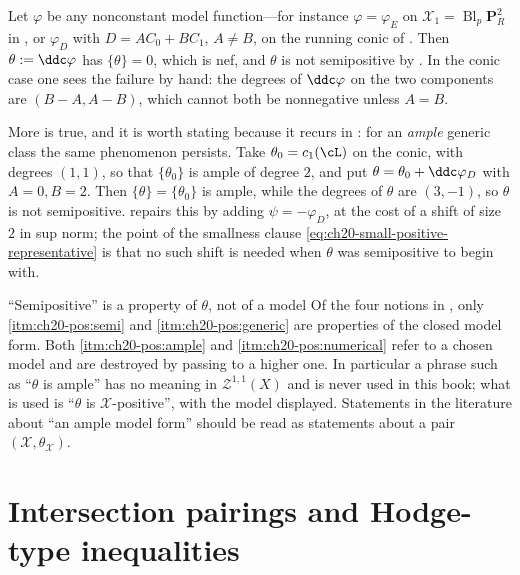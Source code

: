 \begin{example}
\label{ex:ch20-nef-generic-not-semipositive}
Let \(\varphi\) be any nonconstant model function---for instance
\(\varphi=\varphi_E\) on \(\mathcal X_1=\operatorname{Bl}_p\mathbf P^2_R\)
in , or
\(\varphi_D\) with \(D=AC_0+BC_1\), \(A\neq B\), on the running conic of
.  Then \(\theta:=\ddc\varphi\) has
\(\{\theta\}=0\), which is nef, and \(\theta\) is not semipositive by
.  In the conic case one sees the
failure by hand: the degrees of \(\ddc\varphi\) on the two components are
\((B-A,A-B)\), which cannot both be nonnegative unless \(A=B\).

More is true, and it is worth stating because it recurs in
: for an \emph{ample} generic class the same
phenomenon persists.  Take \(\theta_0=c_1(\cL)\) on the conic, with degrees
\((1,1)\), so that \(\{\theta_0\}\) is ample of degree \(2\), and put
\(\theta=\theta_0+\ddc\varphi_D\) with \(A=0,B=2\).  Then
\(\{\theta\}=\{\theta_0\}\) is ample, while the degrees of \(\theta\) are
\((3,-1)\), so \(\theta\) is not semipositive.
 repairs this by adding
\(\psi=-\varphi_D\), at the cost of a shift of size \(2\) in sup norm; the
point of the smallness clause \eqref{eq:ch20-small-positive-representative}
is that no such shift is needed when \(\theta\) was semipositive to begin
with.
\end{example}

\begin{warning}{``Semipositive'' is a property of \(\theta\), not of a model}
Of the four notions in , only
\cref{itm:ch20-pos:semi} and \cref{itm:ch20-pos:generic} are properties of the
closed model form.  Both \cref{itm:ch20-pos:ample} and
\cref{itm:ch20-pos:numerical} refer to a chosen model and are destroyed by
passing to a higher one.  In particular a phrase such as ``\(\theta\) is
ample'' has no meaning in \(\mathcal Z^{1,1}(X)\) and is never used in this
book; what is used is ``\(\theta\) is \(\mathcal X\)-positive'', with the
model displayed.  Statements in the literature about ``an ample model
form'' should be read as statements about a pair \((\mathcal X,\theta_{\mathcal X})\).
\end{warning}

\section{Intersection pairings and Hodge-type inequalities}
\label{sec:ch20-intersection}

